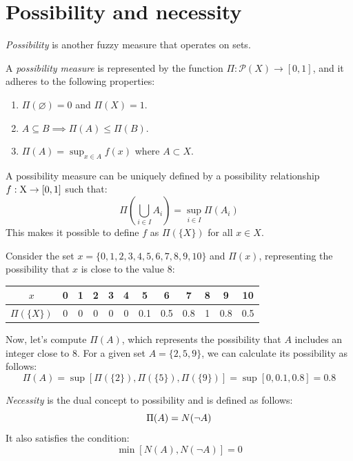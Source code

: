 \section{Possibility and necessity}

\begin{definition}
    \emph{Possibility} is another fuzzy measure that operates on sets. 
    
    A \emph{possibility measure} is represented by the function $\Pi : \mathcal{P}(X) \rightarrow [0,1]$, and it adheres to the following properties:
    \begin{enumerate}
        \item $\Pi(\varnothing)=0$ and $\Pi(X)=1$.
        \item $A \subseteq B \implies \Pi(A) \leq \Pi(B)$. 
        \item $\Pi(A)=\sup_{x \in A} f(x)$ where $A \subset X$. 
    \end{enumerate}
\end{definition}
A possibility measure can be uniquely defined by a possibility relationship $f:\textnormal{X} \rightarrow [0,1]$ such that:
\[\Pi\left(\bigcup_{i \in I}A_i\right)=\sup_{i \in I}\Pi\left(A_i\right)\]
This makes it possible to define $f$ as $\Pi\left(\{X\}\right)$ for all $x \in X$.
\begin{example}
    Consider the set $x=\{0,1,2,3,4,5,6,7,8,9,10\}$ and $\Pi({x})$, representing the possibility that $x$ is close to the value $8$:
    \begin{center}
        \begin{tabular}{|c|c|c|c|c|c|c|c|c|c|c|c|} 
            \hline
            $x$                         & 0 & 1 & 2 & 3 & 4 & 5     & 6     & 7     & 8 & 9     & 10    \\ \hline
            $\Pi\left(\{X\}\right) $    & 0 & 0 & 0 & 0 & 0 & 0.1   & 0.5   & 0.8   & 1 & 0.8   & 0.5   \\ \hline
        \end{tabular}
    \end{center}
    Now, let's compute $\Pi(A)$, which represents the possibility that $A$ includes an integer close to $8$. 
    For a given set $A=\{2,5,9\}$, we can calculate its possibility as follows: 
    \[\Pi(A)=\sup \left[\Pi\left(\{2\}\right), \Pi\left(\{5\}\right), \Pi\left(\{9\}\right)\right]=\sup\left[0,0.1,0.8\right]=0.8\]
\end{example}
\begin{definition}
    \emph{Necessity} is the dual concept to possibility and is defined as follows:
    \[\Pi(A)=\-N(\lnot A)\]
    It also satisfies the condition:
    \[\min\left[N(A),N(\lnot A)\right]=0\]
\end{definition}
